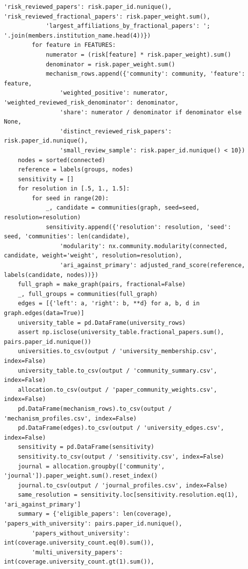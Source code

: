 \begin{Verbatim}[breaklines,breakanywhere,fontsize=\small]
            'risk_reviewed_papers': risk.paper_id.nunique(), 'risk_reviewed_fractional_papers': risk.paper_weight.sum(),
            'largest_affiliations_by_fractional_papers': '; '.join(members.institution_name.head(4))})
        for feature in FEATURES:
            numerator = (risk[feature] * risk.paper_weight).sum()
            denominator = risk.paper_weight.sum()
            mechanism_rows.append({'community': community, 'feature': feature,
                'weighted_positive': numerator, 'weighted_reviewed_risk_denominator': denominator,
                'share': numerator / denominator if denominator else None,
                'distinct_reviewed_risk_papers': risk.paper_id.nunique(),
                'small_review_sample': risk.paper_id.nunique() < 10})
    nodes = sorted(connected)
    reference = labels(groups, nodes)
    sensitivity = []
    for resolution in [.5, 1., 1.5]:
        for seed in range(20):
            _, candidate = communities(graph, seed=seed, resolution=resolution)
            sensitivity.append({'resolution': resolution, 'seed': seed, 'communities': len(candidate),
                'modularity': nx.community.modularity(connected, candidate, weight='weight', resolution=resolution),
                'ari_against_primary': adjusted_rand_score(reference, labels(candidate, nodes))})
    full_graph = make_graph(pairs, fractional=False)
    _, full_groups = communities(full_graph)
    edges = [{'left': a, 'right': b, **d} for a, b, d in graph.edges(data=True)]
    university_table = pd.DataFrame(university_rows)
    assert np.isclose(university_table.fractional_papers.sum(), pairs.paper_id.nunique())
    universities.to_csv(output / 'university_membership.csv', index=False)
    university_table.to_csv(output / 'community_summary.csv', index=False)
    allocation.to_csv(output / 'paper_community_weights.csv', index=False)
    pd.DataFrame(mechanism_rows).to_csv(output / 'mechanism_profiles.csv', index=False)
    pd.DataFrame(edges).to_csv(output / 'university_edges.csv', index=False)
    sensitivity = pd.DataFrame(sensitivity)
    sensitivity.to_csv(output / 'sensitivity.csv', index=False)
    journal = allocation.groupby(['community', 'journal']).paper_weight.sum().reset_index()
    journal.to_csv(output / 'journal_profiles.csv', index=False)
    same_resolution = sensitivity.loc[sensitivity.resolution.eq(1), 'ari_against_primary']
    summary = {'eligible_papers': len(coverage), 'papers_with_university': pairs.paper_id.nunique(),
        'papers_without_university': int(coverage.university_count.eq(0).sum()),
        'multi_university_papers': int(coverage.university_count.gt(1).sum()),

\end{Verbatim}
